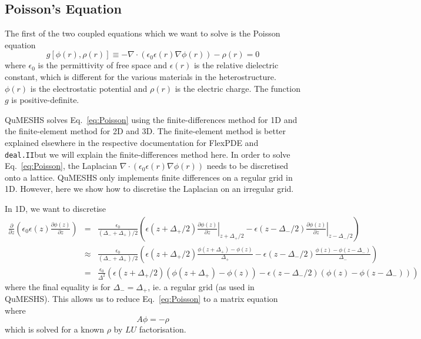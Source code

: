 \documentclass[12pt]{article}
\newcommand{\red}[1]{{\color{red} \it #1}}
\newcommand{\dealii}{\texttt{deal.II}}
\newcommand{\commentout}[1]{}
\begin{document}
\subsection{Poisson's Equation}

The first of the two coupled equations which we want to solve is the Poisson equation
%
\begin{equation}
    \label{eq:Poisson}
    g \left[ \phi(r), \rho(r) \right] \equiv - \nabla \cdot \left(\epsilon_0 \epsilon(r) \nabla \phi(r)\right) - \rho(r) = 0
\end{equation}
%
where $\epsilon_0$ is the permittivity of free space and $\epsilon(r)$ is the relative
dielectric constant, which is different for the various materials in the heterostructure.
$\phi(r)$ is the electrostatic potential and $\rho(r)$ is the electric charge.   The
function $g$ is positive-definite.

QuMESHS solves Eq.~\ref{eq:Poisson} using the finite-differences method for 1D and
the finite-element method for 2D and 3D.  The finite-element method is better explained
elsewhere in the respective documentation for FlexPDE and \dealii but we will explain
the finite-differences method here.  In order to solve Eq.~\ref{eq:Poisson}, the
Laplacian $\nabla \cdot \left(\epsilon_0 \epsilon(r) \nabla \phi(r)\right)$ needs to
be discretised onto a lattice.  QuMESHS only implements finite
differences on a regular grid in 1D.  However, here we show how to discretise the
Laplacian on an irregular grid.

In 1D, we want to discretise
%
\begin{eqnarray}
    \frac{\partial}{\partial z} \left( \epsilon_0 \epsilon(z) \frac{\partial \phi(z)}{\partial z} \right)
    & = & \frac{\epsilon_0}{(\Delta_- + \Delta_+) / 2} \left( \epsilon(z + \Delta_+ / 2) \left. \frac{\partial \phi(z)}{\partial z} \right|_{z + \Delta_+ / 2}
    - \epsilon(z - \Delta_- / 2) \left. \frac{\partial \phi(z)}{\partial z} \right|_{z - \Delta_- / 2} \right) \\
    & \approx & \frac{\epsilon_0}{(\Delta_- + \Delta_+) / 2} \left(\epsilon(z + \Delta_+ / 2) \frac{\phi(z + \Delta_+) - \phi(z)}{\Delta_+}
    - \epsilon(z - \Delta_- / 2) \frac{\phi(z) - \phi(z - \Delta_-)}{\Delta_-} \right) \\
    & = & \frac{\epsilon_0}{\Delta^2} \left(\epsilon(z + \Delta_+ / 2) \left(\phi(z + \Delta_+) - \phi(z)\right) -  \epsilon(z - \Delta_- / 2) \left(\phi(z) - \phi(z - \Delta_-)\right) \right)
\end{eqnarray}
%
where the final equality is for $\Delta_- = \Delta_+$, ie. a regular grid (as used in
QuMESHS). \commentout{ This discretisation can be put in matrix form:
%
\red{some matrix}
%
\red{some details on how to do boundary conditions}}
This allows us to reduce Eq.~\ref{eq:Poisson} to a matrix equation where
%
\begin{equation}
    A \phi = - \rho
\end{equation}
%
which is solved for a known $\rho$ by $LU$ factorisation.
\end{document}
